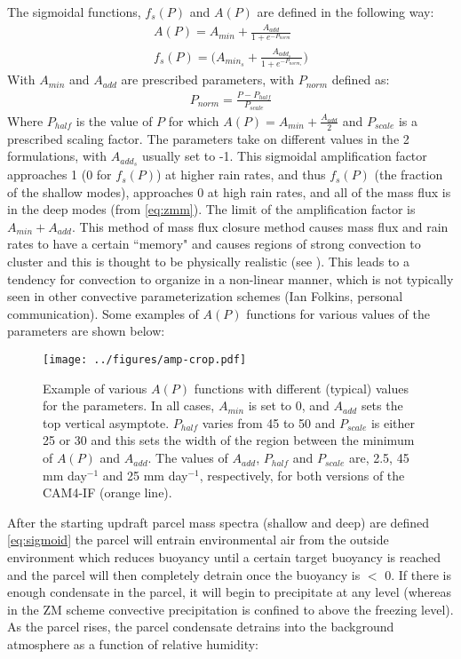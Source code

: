 \documentclass[letterpaper,12pt,titlepage,oneside,final]{book}
\begin{document}
The sigmoidal functions, $f_{s}(P)$ and $A(P)$ are defined in the following way:
\begin{align}\label{eq:sigmoid}
A(P)=A_{min}+\frac{A_{add}}{1+e^{-P_{norm}}}
\\
f_{s}(P)=\Big(A_{min_{s}}+\frac{A_{add_{s}}}{1+e^{-P_{norm_{s}}}}\Big)
\end{align}
With $A_{min}$ and $A_{add}$ are prescribed parameters, with $P_{norm}$ defined as:
\begin{align}
P_{norm}=\frac{P-P_{half}}{P_{scale}}
\end{align}
Where $P_{half}$ is the value of $P$ for which $A(P) = A_{min} + \frac{A_{add}}{2}$ and $P_{scale}$ is a prescribed scaling factor. The parameters take on different values in the 2 formulations, with $A_{add_{s}}$ usually set to -1. This sigmoidal amplification factor approaches 1 (0 for $f_{s}(P)$) at higher rain rates, and thus $f_{s}(P)$ (the fraction of the shallow modes), approaches 0 at high rain rates, and all of the mass flux is in the deep modes (from \ref{eq:zmm}). The limit of the amplification factor is $A_{min} + A_{add}$. This method of mass flux closure method causes mass flux and rain rates to have a certain ``memory" and causes regions of strong convection to cluster and this is thought to be physically realistic (see \cite{mapes_gregarious_1993}). This leads to a tendency for convection to organize in a non-linear manner, which is not typically seen in other convective parameterization schemes (Ian Folkins, personal communication). Some examples of $A(P)$ functions for various values of the parameters are shown below:
\begin{figure}[H]
\centering
\noindent\texttt{[image: ../figures/amp-crop.pdf]}\hfill
\caption{Example of various $A(P)$ functions with different (typical) values for the parameters. In all cases, $A_{min}$ is set to 0, and $A_{add}$ sets the top vertical asymptote. $P_{half}$ varies from 45 to 50 and $P_{scale}$ is either 25 or 30 and this sets the width of the region between the minimum of $A(P)$ and $A_{add}$. The values of $A_{add}$, $P_{half}$ and $P_{scale}$ are, 2.5, 45 mm day$^{-1}$ and 25 mm day$^{-1}$, respectively, for both versions of the CAM4-IF (orange line).}
\label{fig:sigmoid}
\end{figure}
After the starting updraft parcel mass spectra (shallow and deep) are defined \ref{eq:sigmoid} the parcel will entrain environmental air from the outside environment which reduces buoyancy until a certain target buoyancy is reached and the parcel will then completely detrain once the buoyancy is $<$ 0. If there is enough condensate in the parcel, it will begin to precipitate at any level (whereas in the ZM scheme convective precipitation is confined to above the freezing level). As the parcel rises, the parcel condensate detrains into the background atmosphere as a function of relative humidity:
\end{document}
